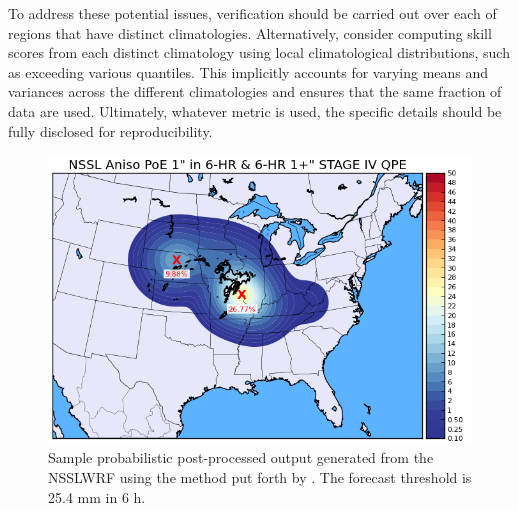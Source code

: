 To address these potential issues, verification should be carried out over each of regions that have distinct climatologies. Alternatively, consider computing skill scores from each distinct climatology using local climatological distributions, such as exceeding various quantiles. This implicitly accounts for varying means and variances across the different climatologies and ensures that the same fraction of data are used. Ultimately, whatever metric is used, the specific details should be fully disclosed for reproducibility.





\label{2011ssef}





\newpage


\begin{figure}
    \begin{center}
        \includegraphics[scale=0.50]{figs/nssl.png}
        \caption{\small Sample probabilistic post-processed output generated from the NSSLWRF using the method put forth by \cite{marsh2012calibration}. The forecast threshold is 25.4 mm in 6 h.}
        \label{fig:nssl}
    \end{center}
\end{figure}


